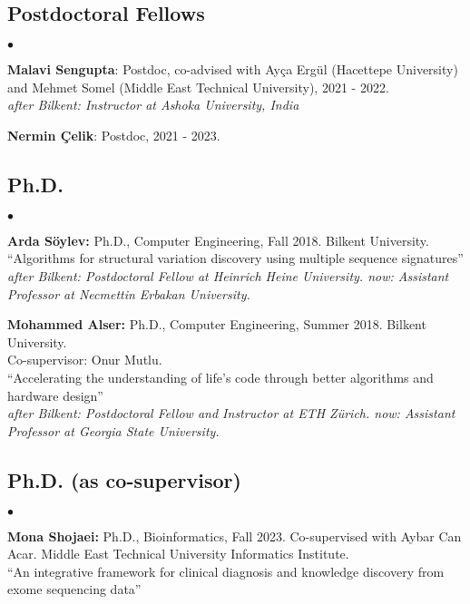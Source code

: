 \documentclass[margin,line]{res}
\newenvironment{list2}{
  \begin{list}{$\bullet$}{%
      \setlength{\itemsep}{0.1cm}
      \setlength{\parsep}{0in} \setlength{\parskip}{0in}
      \setlength{\topsep}{0in} \setlength{\partopsep}{0in} 
      \setlength{\leftmargin}{0.2in}}}{\end{list}}
\begin{document}
\begin{resume}
\subsection{\small \sc Postdoctoral Fellows}
\begin{list2}
\item 
{\bf Malavi Sengupta}: Postdoc, co-advised with Ayça Ergül (Hacettepe University) and Mehmet Somel (Middle East Technical University), 2021 - 2022.\\
\textit{after Bilkent: Instructor at Ashoka University,  India}
\item 
{\bf Nermin Çelik}: Postdoc, 2021 - 2023.
\end{list2}

\vspace*{-.4cm}

\subsection{\small \sc Ph.D.}
\begin{list2}
\item
  {\bf Arda Söylev:} Ph.D., Computer Engineering, Fall 2018.
  Bilkent University. \\
  ``Algorithms for structural variation discovery using multiple sequence signatures''\\
    {\it after Bilkent: Postdoctoral Fellow at Heinrich Heine University. now: Assistant Professor at Necmettin Erbakan University.}
\item
  {\bf Mohammed Alser:} Ph.D., Computer Engineering, Summer 2018.
  Bilkent University.\\ Co-supervisor: Onur Mutlu.\\
  ``Accelerating the understanding of life’s code through better algorithms and hardware design''\\
  {\it after Bilkent: Postdoctoral Fellow and Instructor at ETH Zürich. now: Assistant Professor at Georgia State University.}
\end{list2}

\clearpage

\vspace*{-.4cm}
\subsection{\small \sc Ph.D. (as co-supervisor)}
\begin{list2}
\item
{\bf Mona Shojaei:} Ph.D., Bioinformatics,  Fall 2023.
Co-supervised with Aybar Can Acar.
  Middle East Technical University Informatics Institute.\\
  ``An integrative framework for clinical diagnosis and knowledge discovery from exome sequencing data''


\end{list2}
\end{resume}
\end{document}
